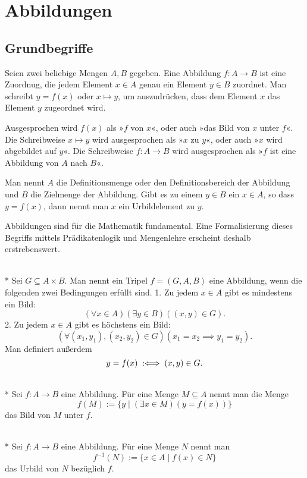 \newpage
\section{Abbildungen}
\subsection{Grundbegriffe}
Seien zwei beliebige Mengen $A,B$ gegeben. Eine Abbildung
$f\colon A\to B$ ist eine Zuordnug, die jedem Element $x\in A$
genau ein Element $y\in B$ zuordnet. Man schreibt $y=f(x)$
oder $x\mapsto y$, um auszudrücken, dass dem Element $x$
das Element $y$ zugeordnet wird.

Ausgesprochen wird $f(x)$ als »$f$ von $x$«, oder auch
»das Bild von $x$ unter $f$«. Die Schreibweise $x\mapsto y$
wird ausgesprochen als »$x$ zu $y$«, oder auch
»$x$ wird abgebildet auf $y$«. Die Schreibweise
$f\colon A\to B$ wird ausgesprochen als »$f$ ist eine
Abbildung von $A$ nach $B$«.

Man nennt $A$ die Definitionsmenge oder den Definitionsbereich
der Abbildung und $B$ die Zielmenge der Abbildung. Gibt es zu
einem $y\in B$ ein $x\in A$, so dass $y=f(x)$, dann nennt man
$x$ ein Urbildelement zu $y$.

Abbildungen sind für die Mathematik fundamental. Eine
Formalisierung dieses Begriffs mittels Prädikatenlogik
und Mengenlehre erscheint deshalb erstrebenswert.

\begin{Definition}[Abbildung]\mbox{}\\*
Sei $G\subseteq A\times B$. Man nennt ein Tripel $f=(G,A,B)$ eine
Abbildung, wenn die folgenden zwei Bedingungen erfüllt sind.
1. Zu jedem $x\in A$ gibt es mindestens ein Bild:
\[(\forall x\in A)(\exists y\in B)((x,y)\in G).\]
2. Zu jedem $x\in A$ gibt es höchstens ein Bild:
\[(\forall (x_1,y_1),(x_2,y_2)\in G)(x_1=x_2\implies y_1=y_2).\]
Man definiert außerdem
\[y=f(x)\;:\Longleftrightarrow\; (x,y)\in G.\]
\end{Definition}

\begin{Definition}[Bildmenge]\mbox{}\\*
Sei $f\colon A\to B$ eine Abbildung.
Für eine Menge $M\subseteq A$ nennt man die Menge
\[f(M) := \{y\mid(\exists x\in M)(y=f(x))\}\]
das Bild von $M$ unter $f$.
\end{Definition}

\begin{Definition}[Urbildmenge]\mbox{}\\*
Sei $f\colon A\to B$ eine Abbildung. Für eine Menge $N$ nennt man
\[f^{-1}(N) := \{x\in A\mid f(x)\in N\}\]
das Urbild von $N$ bezüglich $f$.
\end{Definition}

